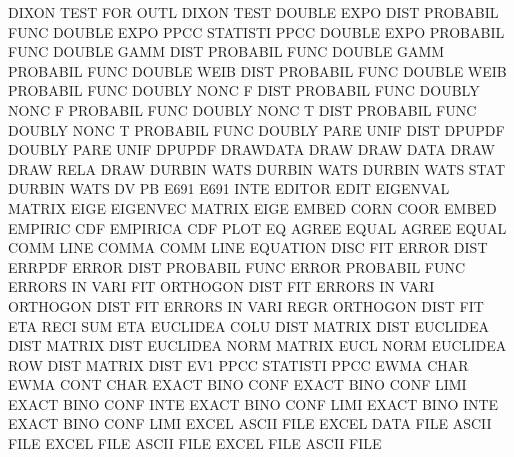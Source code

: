 DIXON    TEST FOR  OUTL                 DIXON    TEST
DOUBLE   EXPO DIST                      PROBABIL FUNC
DOUBLE   EXPO PPCC                      STATISTI PPCC
DOUBLE   EXPO                           PROBABIL FUNC
DOUBLE   GAMM DIST                      PROBABIL FUNC
DOUBLE   GAMM                           PROBABIL FUNC
DOUBLE   WEIB DIST                      PROBABIL FUNC
DOUBLE   WEIB                           PROBABIL FUNC
DOUBLY   NONC F    DIST                 PROBABIL FUNC
DOUBLY   NONC F                         PROBABIL FUNC
DOUBLY   NONC T    DIST                 PROBABIL FUNC
DOUBLY   NONC T                         PROBABIL FUNC
DOUBLY   PARE UNIF DIST                 DPUPDF
DOUBLY   PARE UNIF                      DPUPDF
DRAWDATA                                DRAW
DRAW     DATA                           DRAW
DRAW     RELA                           DRAW
DURBIN   WATS                           DURBIN   WATS
DURBIN   WATS STAT                      DURBIN   WATS
DV                                      PB
E691                                    E691     INTE
EDITOR                                  EDIT
EIGENVAL                                MATRIX   EIGE
EIGENVEC                                MATRIX   EIGE
EMBED    CORN COOR                      EMBED
EMPIRIC  CDF                            EMPIRICA CDF  PLOT
EQ                                      AGREE
EQUAL                                   AGREE
EQUAL    COMM LINE                      COMMA    COMM LINE
EQUATION DISC                           FIT
ERROR    DIST                           ERRPDF
ERROR    DIST                           PROBABIL FUNC
ERROR                                   PROBABIL FUNC
ERRORS   IN   VARI FIT                  ORTHOGON DIST FIT
ERRORS   IN   VARI                      ORTHOGON DIST FIT
ERRORS   IN   VARI REGR                 ORTHOGON DIST FIT
ETA      RECI SUM                       ETA
EUCLIDEA COLU DIST                      MATRIX   DIST
EUCLIDEA DIST                           MATRIX   DIST
EUCLIDEA NORM                           MATRIX   EUCL NORM
EUCLIDEA ROW  DIST                      MATRIX   DIST
EV1      PPCC                           STATISTI PPCC
EWMA     CHAR                           EWMA     CONT CHAR
EXACT    BINO CONF                      EXACT    BINO CONF LIMI
EXACT    BINO CONF INTE                 EXACT    BINO CONF LIMI
EXACT    BINO INTE                      EXACT    BINO CONF LIMI
EXCEL                                   ASCII    FILE
EXCEL    DATA FILE                      ASCII    FILE
EXCEL    FILE                           ASCII    FILE
EXCEL    FILE                           ASCII    FILE
